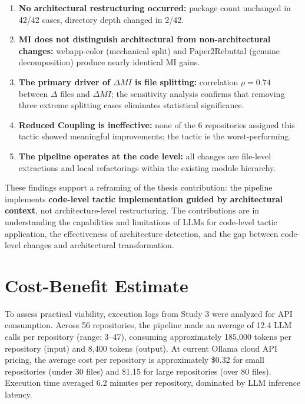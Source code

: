\begin{enumerate}
    \item \textbf{No architectural restructuring occurred:} package count unchanged in 42/42 cases, directory depth changed in 2/42.
    \item \textbf{MI does not distinguish architectural from non-architectural changes:} webapp-color (mechanical split) and Paper2Rebuttal (genuine decomposition) produce nearly identical MI gains.
    \item \textbf{The primary driver of $\Delta MI$ is file splitting:} correlation $\rho = 0.74$ between $\Delta$ files and $\Delta MI$; the sensitivity analysis confirms that removing three extreme splitting cases eliminates statistical significance.
    \item \textbf{Reduced Coupling is ineffective:} none of the 6 repositories assigned this tactic showed meaningful improvements; the tactic is the worst-performing.
    \item \textbf{The pipeline operates at the code level:} all changes are file-level extractions and local refactorings within the existing module hierarchy.
\end{enumerate}

These findings support a reframing of the thesis contribution: the pipeline implements \textbf{code-level tactic implementation guided by architectural context}, not architecture-level restructuring. The contributions are in understanding the capabilities and limitations of LLMs for code-level tactic application, the effectiveness of architecture detection, and the gap between code-level changes and architectural transformation.

\section{Cost-Benefit Estimate}
\label{sec:eval_costbenefit}

To assess practical viability, execution logs from Study 3 were analyzed for API consumption. Across 56 repositories, the pipeline made an average of 12.4 LLM calls per repository (range: 3--47), consuming approximately 185,000 tokens per repository (input) and 8,400 tokens (output). At current Ollama cloud API pricing, the average cost per repository is approximately \$0.32 for small repositories (under 30 files) and \$1.15 for large repositories (over 80 files). Execution time averaged 6.2 minutes per repository, dominated by LLM inference latency.

